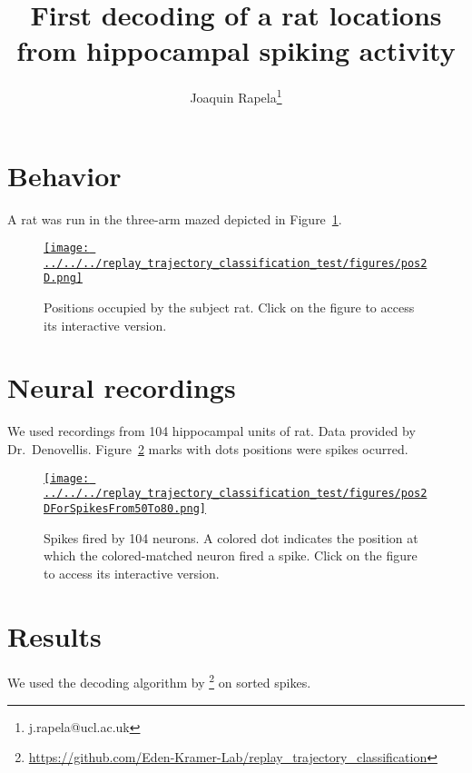 \documentclass{article}
\title{First decoding of a rat locations from hippocampal spiking activity}
\author{Joaquin Rapela\thanks{j.rapela@ucl.ac.uk}}
\begin{document}
\maketitle

\section{Behavior}

A rat was run in the three-arm mazed depicted in Figure~\ref{fig:pos2D}.

\begin{figure}
    \begin{center}
        \href{https://www.gatsby.ucl.ac.uk/~rapela/hippocampalDecoding/figures/pos2D.html}{\texttt{[image: ../../../replay\_trajectory\_classification\_test/figures/pos2D.png]}}
		\caption{Positions occupied by the subject rat. Click on the figure to access its interactive version.}
        \label{fig:pos2D}
    \end{center}
\end{figure}

\section{Neural recordings}

We used recordings from 104 hippocampal units of rat. Data provided by Dr.~Denovellis. Figure~\ref{fig:pos2DforSpikes} marks with dots positions were spikes ocurred.

\begin{figure}
    \begin{center}
        \href{https://www.gatsby.ucl.ac.uk/~rapela/hippocampalDecoding/figures/pos2DForSpikesFrom50To80.html}{\texttt{[image: ../../../replay\_trajectory\_classification\_test/figures/pos2DForSpikesFrom50To80.png]}}
		\caption{Spikes fired by 104 neurons. A colored dot indicates the position at which the colored-matched neuron fired a spike. Click on the figure to access its interactive version.}
        \label{fig:pos2DforSpikes}
    \end{center}
\end{figure}

\section{Results}

We used the decoding algorithm by
\citep{denovellisEtAl21}\footnote{\url{https://github.com/Eden-Kramer-Lab/replay_trajectory_classification}}
on sorted spikes.
\end{document}
